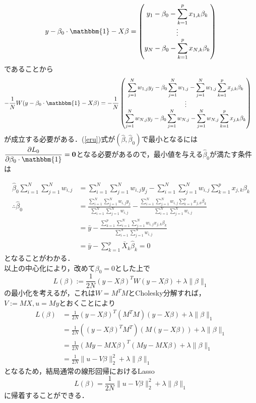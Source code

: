 \documentclass{jsarticle}
\theoremstyle{definition}
\theoremstyle{mystyle} %
\begin{document}
\begin{align*}
y-\beta_0\cdot\mathbbm{1}-X\beta=\begin{pmatrix}
y_1-\beta_0-\displaystyle\sum_{k=1}^px_{1,k}\beta_k\\
\vdots\\
y_N-\beta_0-\displaystyle\sum_{k=1}^px_{N,k}\beta_k
\end{pmatrix}
\end{align*}
であることから
\begin{align*}
-\frac{1}{N}W(y-\beta_0\cdot\mathbbm{1}-X\beta)&=-\frac{1}{N}\begin{pmatrix}
\displaystyle\sum_{j=1}^Nw_{1,j}y_j-\beta_0\sum_{j=1}^Nw_{1,j}-\sum_{j=1}^Nw_{1,j}\sum_{k=1}^px_{j,k}\beta_k\\
\vdots\\
\displaystyle\sum_{j=1}^Nw_{N,j}y_j-\beta_0\sum_{j=1}^Nw_{N,j}-\sum_{j=1}^Nw_{N,j}\sum_{k=1}^px_{j,k}\beta_k
\end{pmatrix}
\end{align*}
が成立する必要がある．(\ref{eru})式が$(\hat{\beta},\hat{\beta}_0)$で最小となるには$\displaystyle\frac{\partial L_0}{\partial \beta_0\cdot\mathbbm{1}}={\bm 0}$となる必要があるので，最小値を与える$\hat{\beta}_0$が満たす条件は

\begin{align*}
\hat{\beta}_0\sum_{i=1}^N\sum_{j=1}^Nw_{i,j}&=\sum_{i=1}^N\sum_{j=1}^Nw_{i,j}y_j-\sum_{i=1}^N \sum_{j=1}^Nw_{i,j}\sum_{k=1}^px_{j,k}\beta_k\\
\therefore \hat{\beta}_0&=\frac{\sum_{i=1}^N\sum_{j=1}^Nw_{i,j}y_j}{\sum_{i=1}^N\sum_{j=1}^Nw_{i,j}}-\frac{\sum_{i=1}^N \sum_{j=1}^Nw_{i,j}\sum_{k=1}^px_{j,k}\beta_k}{\sum_{i=1}^N\sum_{j=1}^Nw_{i,j}}\\
&=\bar{y}-\frac{\sum_{k=1}^p\sum_{i=1}^N \sum_{j=1}^Nw_{i,j}x_{j,k}\beta_k}{\sum_{i=1}^N\sum_{j=1}^Nw_{i,j}}\\
&=\bar{y}-\sum_{k=1}^p \bar{X}_k\hat{\beta}_k=0
\end{align*}
となることがわかる．\\

以上の中心化により，改めて$\beta_0=0$とした上で
$$L(\beta):=\frac{1}{2N}(y-X\beta)^TW(y-X\beta)+\lambda\|\beta\|_1$$
の最小化を考えるが，これは$W=M^TM$とCholesky分解すれば，$V:=MX,u=My$とおくことにより
\begin{align*}
L(\beta)&=\frac{1}{2N}(y-X\beta)^T(M^T M)(y-X\beta)+\lambda\|\beta\|_1\\
&=\frac{1}{2N}((y-X\beta)^TM^T)(M(y-X\beta))+\lambda\|\beta\|_1\\
&=\frac{1}{2N}(My-MX\beta)^T(My-MX\beta)+\lambda\|\beta\|_1\\
&=\frac{1}{2N}\|u-V\beta\|_2^2+\lambda\|\beta\|_1
\end{align*}
となるため，結局通常の線形回帰におけるLasso
$$L(\beta)=\frac{1}{2N}\|u-V\beta\|_2^2+\lambda\|\beta\|_1$$
に帰着することができる．\\
\end{document}
